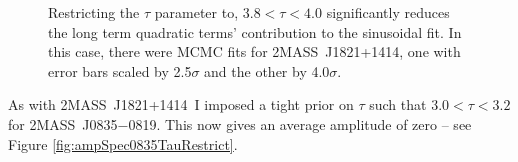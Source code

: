 \documentclass[manuscript]{aastex6}
\newcommand{\sha}{2MASS~J0835$-$0819}
\newcommand{\shb}{2MASS~J1821+1414}
\begin{document}
\begin{figure}[!t]
\centering
{}
	\caption{Restricting the $\tau$ parameter to, $3.8 < \tau < 4.0$ significantly reduces the long term quadratic terms' contribution to the sinusoidal fit. In this case, there were MCMC fits for \shb, one with error bars scaled by 2.5$\sigma$ and the other by 4.0$\sigma$.}
	\label{fig:ampSpecManualSTauRestrict}
	\vspace{0.1in}
\end{figure} 

As with \shb\ I imposed a tight prior on $\tau$ such that $3.0 < \tau < 3.2$ for \sha. This now gives an average amplitude of zero -- see Figure \ref{fig:ampSpec0835TauRestrict}.
\end{document}
